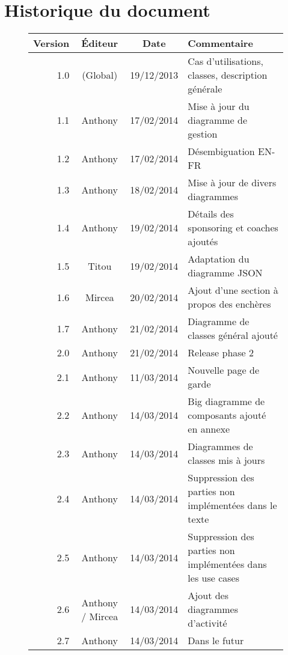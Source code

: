 \documentclass[a4paper, 11pt]{report}
\begin{document}
\section{Historique du document}
\begin{figure}[h!]
\centering
\begin{tabular}{| r | c | c | l |}
\hline
\textbf{Version} & \textbf{Éditeur} & \textbf{Date} & \textbf{Commentaire} \\
\hline
1.0 & (Global) & 19/12/2013 & Cas d'utilisations, classes, description générale\\
\hline
1.1 & Anthony & 17/02/2014 & Mise à jour du diagramme de gestion\\
\hline
1.2 & Anthony & 17/02/2014 & Désembiguation EN-FR\\
\hline
1.3 & Anthony & 18/02/2014 & Mise à jour de divers diagrammes\\
\hline
1.4 & Anthony & 19/02/2014 & Détails des sponsoring et coaches ajoutés\\
\hline
1.5 & Titou & 19/02/2014 & Adaptation du diagramme JSON\\
\hline
1.6 & Mircea & 20/02/2014 & Ajout d'une section à propos des enchères\\
\hline
1.7 & Anthony & 21/02/2014 & Diagramme de classes général ajouté\\
\hline
2.0 & Anthony & 21/02/2014 & Release phase 2\\
\hline
2.1 & Anthony & 11/03/2014 & Nouvelle page de garde\\
\hline
2.2 & Anthony & 14/03/2014 & Big diagramme de composants ajouté en annexe\\
\hline
2.3 & Anthony & 14/03/2014 & Diagrammes de classes mis à jours\\
\hline
2.4 & Anthony & 14/03/2014 & Suppression des parties non implémentées dans le texte\\
\hline
2.5 & Anthony & 14/03/2014 & Suppression des parties non implémentées dans les use cases\\
\hline
2.6 & Anthony / Mircea & 14/03/2014 & Ajout des diagrammes d'activité\\
\hline
2.7 & Anthony & 14/03/2014 & Dans le futur\\
\hline
\end{tabular}
\end{figure}

\renewcommand*{\glossaryname}{\section{Glossaire}}
\glsaddall
\printglossaries
\end{document}

